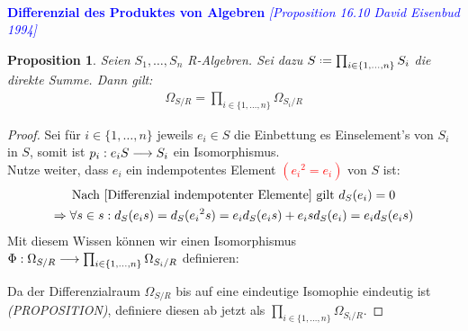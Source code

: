 \documentclass[10pt,a4paper]{report}
\newcommand{\comment}[1]{}
\newcommand{\ModulsOfDifferenzials}{David Eisenbud 1994}
\newcounter{Aussage}[chapter]
\newtheorem{prop}[Aussage]{Proposition}
\newcommand{\functionfront}[3]{\nolinebreak{#1:#2 \longrightarrow #3}}
\newcommand{\divR}[2]{\Omega_{#1/#2}}
\newcommand{\divf}[1]{d_{#1}}
\newcommand*{\defeq}{\mathrel{\vcenter{\baselineskip0.5ex \lineskiplimit0pt
                     \hbox{\scriptsize.}\hbox{\scriptsize.}}}%
                     =}
\begin{document}
\ \\
\textcolor{blue}{\textbf{Differenzial des Produktes von Algebren} \textit{[Proposition 16.10 \ModulsOfDifferenzials]}}
\begin{prop}\label{Differenzial des Produktes von Algebren}
Seien $S_1, \dots , S_n$ R-Algebren. Sei dazu $S \defeq \prod_{i \in \lbrace 1, \dots , n \rbrace} S_i$ die direkte Summe.
Dann gilt:
\begin{gather*}
\divR{S}{R} = \prod_{i \in \lbrace 1, \dots , n \rbrace} \divR{S_i}{R}
\end{gather*}
\end{prop}
\begin{proof}
Sei für $i \in \lbrace 1, \dots ,n \rbrace$ jeweils $e_i \in S$ die Einbettung es Einselement's von $S_i$ in $S$, somit ist $\functionfront{p_i}{e_iS}{S_i}$ ein Isomorphismus.\\
Nutze weiter, dass $e_i$ ein indempotentes Element \textcolor{red}{$({e_i}^2 = e_i)$} von $S$ ist:
\begin{gather*}
\text{Nach \cref{Differenzial indempotenter Elemente} gilt } \divf{S}(e_i) = 0 \\
\Rightarrow \forall s \in s : \divf{S}(e_is)= \divf{S}({e_i}^2s) = e_i\divf{S}(e_is) + e_is\divf{S}(e_i) = e_i\divf{S}(e_is) \\
\end{gather*}
Mit diesem Wissen können wir einen Isomorphismus $\functionfront{\Phi}{\divR{S}{R}}{\prod_{i \in \lbrace 1, \dots , n \rbrace} \divR{S_i}{R}}$ definieren:
\begin{center}
\end{center}
Da der Differenzialraum $\divR{S}{R}$ bis auf eine eindeutige Isomophie eindeutig ist \textit{(PROPOSITION)},\comment{\label{*Differenzial ist eindeutig}} definiere diesen ab jetzt als $\prod_{i \in \lbrace 1, \dots , n \rbrace} \divR{S_i}{R}$.
\end{proof}
\end{document}
